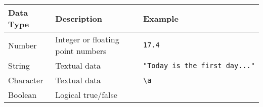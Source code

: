 \documentclass[10pt,twoside,openright]{memoir}
\begin{document}
\begin{longtable}[]{@{}lll@{}}
\toprule
\begin{minipage}[b]{0.15\columnwidth}\raggedright
Data Type\strut
\end{minipage} & \begin{minipage}[b]{0.51\columnwidth}\raggedright
Description\strut
\end{minipage} & \begin{minipage}[b]{0.33\columnwidth}\raggedright
Example\strut
\end{minipage}\tabularnewline
\midrule
\endhead
\begin{minipage}[t]{0.07\columnwidth}\raggedright
Number\strut
\end{minipage} & \begin{minipage}[t]{0.51\columnwidth}\raggedright
Integer or floating point numbers\strut
\end{minipage} & \begin{minipage}[t]{0.33\columnwidth}\raggedright
\texttt{17.4}\strut
\end{minipage}\tabularnewline
\begin{minipage}[t]{0.07\columnwidth}\raggedright
String\strut
\end{minipage} & \begin{minipage}[t]{0.51\columnwidth}\raggedright
Textual data\strut
\end{minipage} & \begin{minipage}[t]{0.33\columnwidth}\raggedright
\texttt{"Today\ is\ the\ first\ day..."}\strut
\end{minipage}\tabularnewline
\begin{minipage}[t]{0.07\columnwidth}\raggedright
Character\strut
\end{minipage} & \begin{minipage}[t]{0.51\columnwidth}\raggedright
Textual data\strut
\end{minipage} & \begin{minipage}[t]{0.33\columnwidth}\raggedright
\texttt{\textbackslash{}a}\strut
\end{minipage}\tabularnewline
\begin{minipage}[t]{0.07\columnwidth}\raggedright
Boolean\strut
\end{minipage} & \begin{minipage}[t]{0.51\columnwidth}\raggedright
Logical true/false\strut
\end{minipage} & \begin{minipage}[t]{0.33\columnwidth}\raggedright

\end{minipage}
\end{longtable}
\end{document}
